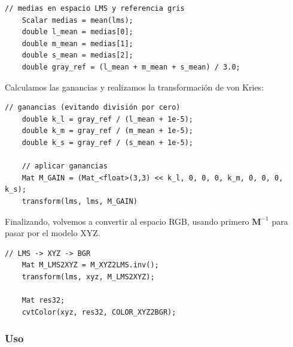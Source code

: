\documentclass[11pt]{article}
\begin{document}
          \begin{lstlisting}[style=CppQtStyle, caption={Cálculo de medias en espacio LMS y referencia gris (\texttt{gray\_ref}).}]
    // medias en espacio LMS y referencia gris
    Scalar medias = mean(lms);
    double l_mean = medias[0];
    double m_mean = medias[1];
    double s_mean = medias[2];
    double gray_ref = (l_mean + m_mean + s_mean) / 3.0;
\end{lstlisting}

          \clearpage

          \noindent
          Calculamos las ganancias y realizamos la transformación de von Kries:

          \begin{lstlisting}[style=CppQtStyle, caption={Cálculo de ganancias y aplicación de la matriz de ganancia (aprox. von Kries).}]
    // ganancias (evitando división por cero)
    double k_l = gray_ref / (l_mean + 1e-5);
    double k_m = gray_ref / (m_mean + 1e-5);
    double k_s = gray_ref / (s_mean + 1e-5);

    // aplicar ganancias
    Mat M_GAIN = (Mat_<float>(3,3) << k_l, 0, 0, 0, k_m, 0, 0, 0, k_s);
    transform(lms, lms, M_GAIN)
\end{lstlisting}

          \noindent
          Finalizando, volvemos a convertir al espacio RGB, usando primero \(\mathbf{M}^{-1}\) para pasar por el modelo XYZ.

          \begin{lstlisting}[style=CppQtStyle, caption={Conversión de espacio LMS -> XYZ -> BGR aplicando la matriz inversa (M\^{-1}).}]
    // LMS -> XYZ -> BGR
    Mat M_LMS2XYZ = M_XYZ2LMS.inv();
    transform(lms, xyz, M_LMS2XYZ);

    Mat res32;
    cvtColor(xyz, res32, COLOR_XYZ2BGR);
\end{lstlisting}

      \subsubsection{Uso}
\end{document}
